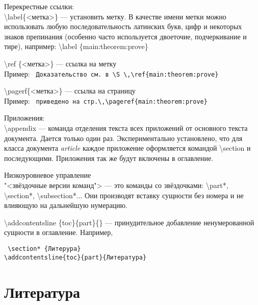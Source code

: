 \noindent
Перекрестные ссылки:\\
\textbackslash label\{<метка>\} --- установить метку. В качестве имени метки можно использовать любую последовательность латинских букв, цифр и некоторых знаков препинания (особенно часто используется двоеточие, подчеркивание и тире), например: \textbackslash label \{main:theorem:prove\}
\medskip

\noindent
\textbackslash ref \{<метка>\} --- ссылка на метку\\
Пример: \texttt{
Доказательство см.~в~\textbackslash S \textbackslash ,\textbackslash ref\{main:theorem:prove\}}
\medskip

\noindent
\textbackslash pagerf\{<метка>\} --- ссылка на страницу\\
Пример: \texttt{
приведено на стр.\textbackslash ,\textbackslash pageref\{main:theorem:prove\}}
\medskip

\noindent
Приложения:\\
\textbackslash appendix --- команда отделения текста всех приложений от основного текста документа. Дается только один раз. Экспериментально установлено, что для класса документа \textit{article} каждое приложение оформляется командой \textbackslash section и последующими. Приложения так же будут включены в оглавление.\\
\medskip

\noindent
Низкоуровневое управление\\
"<звёздочные версии команд"> --- это команды со звёздочками: \textbackslash part*, \textbackslash section*, \textbackslash subsection*... Они производят вставку сущности без номера и не влияющую на дальнейшую нумерацию.\\
\medskip

\noindent
\textbackslash addcontentsline \{toc\}\{part\}\{<имя в оглавлении>\} --- принудительное добавление ненумерованной сущности в оглавление. Например,\\
\medskip

\noindent
\texttt{
\textbackslash section* \{Литерура\}\\
\textbackslash addcontentsline\{toc\}\{part\}\{Литература\}}\\
\medskip

\noindent
\section*{Литература}

\clearpage

